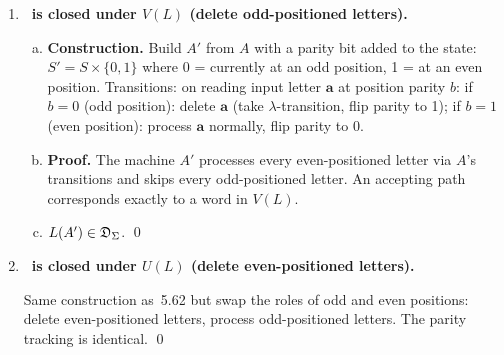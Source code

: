 \begin{enumerate}[{5.}1. ]
\begin{enumerate}[(a)]
  More precisely: $A'$ has state set $S\times\{0,1\}$ where the second component tracks whether at least one letter has been deleted.  Initial state: $\langle s_0,0\rangle$.  Final states: $\{\langle f,1\rangle\mid f\in F\}$.  Transitions: $\delta'(\langle s,b\rangle,\pmb{a})=\langle\delta(s,\pmb{a}),b\rangle$ (read $\pmb{a}$) and $\delta'(\langle s,b\rangle,\lambda)=\langle t,1\rangle$ for each $t$ with $\delta(s,\pmb{a})=t$ (delete $\pmb{a}$, set flag).

  \item \textbf{Proof.}  A word $z$ is in $W(L)$ iff $z$ can be obtained by deleting at least one letter from some $w\in L$.  A path in $A'$ simulates a path in $A$ but uses $\lambda$-transitions to skip letters; the flag ensures at least one skip. Hence $L(A')=W(L)$.

  \item Since $A'$ is a $\lambda$-NDFA, $W(L)\in\DSIG$. \qed
\end{enumerate}

\item \textbf{\DSIG\ is closed under $V(L)$ (delete odd-positioned letters).}

\begin{enumerate}[(a)]
  \item \textbf{Construction.}  Build $A'$ from $A$ with a parity bit added to the state: $S'=S\times\{0,1\}$ where 0 = currently at an odd position, 1 = at an even position.  Transitions: on reading input letter $\pmb{a}$ at position parity $b$:
  if $b=0$ (odd position): delete $\pmb{a}$ (take $\lambda$-transition, flip parity to 1);
  if $b=1$ (even position): process $\pmb{a}$ normally, flip parity to 0.

  \item \textbf{Proof.}  The machine $A'$ processes every even-positioned letter via $A$'s transitions and skips every odd-positioned letter.  An accepting path corresponds exactly to a word in $V(L)$.

  \item $L(A')\in\mathfrak{D}_\Sigma$. \qed
\end{enumerate}

\item \textbf{\DSIG\ is closed under $U(L)$ (delete even-positioned letters).}

Same construction as~5.62 but swap the roles of odd and even positions: delete even-positioned letters, process odd-positioned letters.  The parity tracking is identical. \qed


\end{enumerate}
